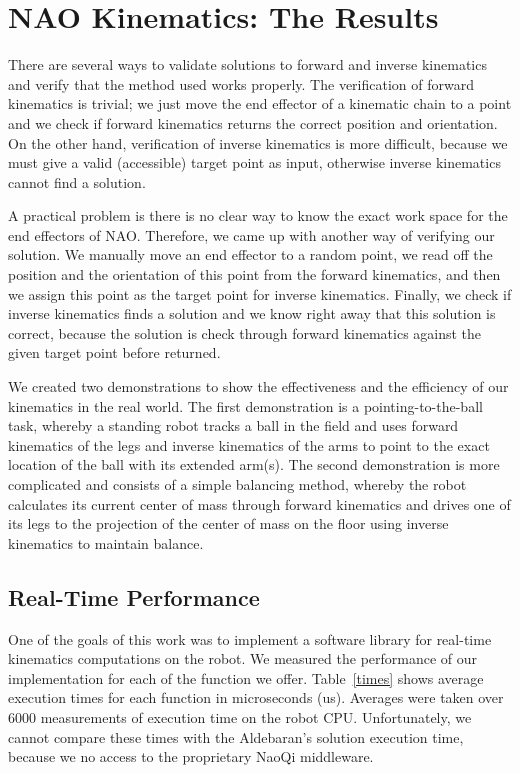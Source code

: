 \chapter{NAO Kinematics: The Results}
\label{Results}

There are several ways to validate solutions to forward and inverse kinematics and verify that the method used works properly. The verification of forward kinematics is trivial; we just move the end effector of a kinematic chain to a point and we check if forward kinematics returns the correct position and orientation. On the other hand, verification of inverse kinematics is more difficult, because we must give a valid (accessible) target point as input, otherwise inverse kinematics cannot find a solution.

A practical problem is there is no clear way to know the exact work space for the end effectors of NAO. Therefore, we came up with another way of verifying our solution. We manually move an end effector to a random point, we read off the position and the orientation of this point from the forward kinematics, and then we assign this point as the target point for inverse kinematics. Finally, we check if inverse kinematics finds a solution and we know right away that this solution is correct, because the solution is check through forward kinematics against the given target point before returned.

We created two demonstrations to show the effectiveness and the efficiency of our kinematics in the real world. The first demonstration is a pointing-to-the-ball task, whereby a standing robot tracks a ball in the field and uses forward kinematics of the legs and inverse kinematics of the arms to point to the exact location of the ball with its extended arm(s). The second demonstration is more complicated and consists of a simple balancing method, whereby the robot calculates its current center of mass through forward kinematics and drives one of its legs to the projection of the center of mass on the floor using inverse kinematics to maintain balance.


\section{Real-Time Performance}
One of the goals of this work was to implement a software library for real-time kinematics computations on the robot. We measured the performance of our implementation for each of the function we offer. Table~\ref{times} shows average execution times for each function in microseconds (us). Averages were taken over 6000 measurements of execution time on the robot CPU. Unfortunately, we cannot compare these times with the Aldebaran's solution execution time, because we no access to the proprietary NaoQi middleware. 

